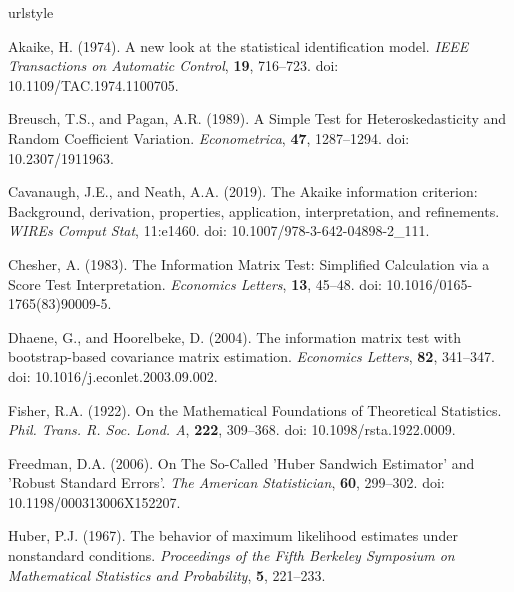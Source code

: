 \documentclass[sn-mathphys-ay]{sn-jnl}
\begin{document}
\begin{thebibliography}{99}
\providecommand{\natexlab}[1]{#1}
\providecommand{\url}[1]{\texttt{#1}}
\expandafter\ifx\csname urlstyle\endcsname\relax
  \providecommand{\doi}[1]{doi: #1}\else
  \providecommand{\doi}{doi: \begingroup \urlstyle{rm}\Url}\fi

{\rm Akaike, H.} (1974).
\newblock A new look at the statistical identification model.
\newblock \emph{IEEE Transactions on Automatic Control}, {\bf 19},  716--723.
\newblock \doi{10.1109/TAC.1974.1100705}.

{\rm Breusch, T.S., and Pagan, A.R.} (1989).
\newblock A Simple Test for Heteroskedasticity and Random Coefficient Variation.
\newblock \emph{Econometrica}, {\bf 47},  1287--1294.
\newblock \doi{10.2307/1911963}.

{\rm Cavanaugh, J.E., and Neath, A.A.} (2019).
\newblock The Akaike information criterion: Background, derivation, properties, application, interpretation, and refinements.
\newblock \emph{WIREs Comput Stat}, 11:e1460.
\newblock \doi{10.1007/978-3-642-04898-2_111}.

{\rm Chesher, A.} (1983).
\newblock The Information Matrix Test: Simplified Calculation via a Score Test Interpretation.
\newblock \emph{Economics Letters}, {\bf 13},  45--48.
\newblock \doi{10.1016/0165-1765(83)90009-5}.

{\rm Dhaene, G., and Hoorelbeke, D.} (2004).
\newblock The information matrix test with bootstrap-based covariance matrix estimation.
\newblock \emph{Economics Letters}, {\bf 82},  341--347.
\newblock \doi{10.1016/j.econlet.2003.09.002}.

{\rm Fisher, R.A.} (1922).
\newblock On the Mathematical Foundations of Theoretical Statistics.
\newblock \emph{Phil. Trans. R. Soc. Lond. A}, {\bf 222},  309--368.
\newblock \doi{10.1098/rsta.1922.0009}.

{\rm Freedman, D.A.} (2006).
\newblock On The So-Called 'Huber Sandwich Estimator' and 'Robust Standard Errors'.
\newblock \emph{The American Statistician}, {\bf 60},  299--302.
\newblock \doi{10.1198/000313006X152207}.

{\rm Huber, P.J.} (1967).
\newblock The behavior of maximum likelihood estimates under nonstandard conditions.
\newblock \emph{Proceedings of the Fifth Berkeley Symposium on Mathematical Statistics and Probability}, {\bf 5},  221--233.


\end{thebibliography}
\end{document}
